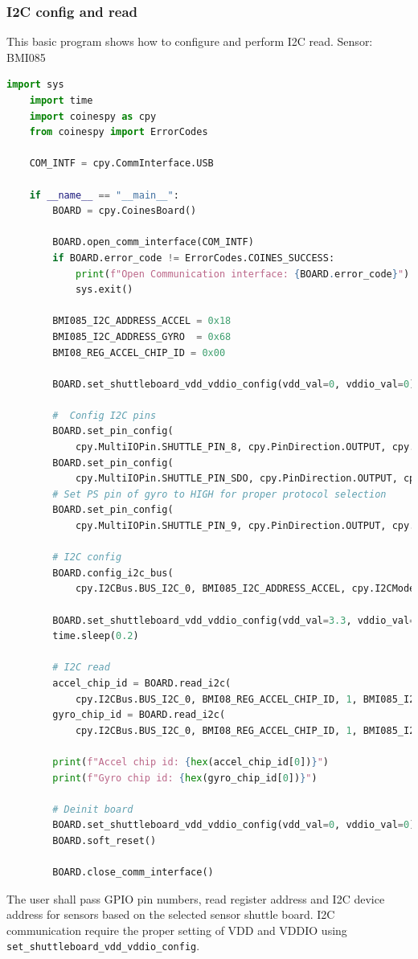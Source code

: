 \documentclass[11pt,headings=small]{scrartcl}
\begin{document}
\subsubsection{I2C config and read}
This basic program shows how to configure and perform I2C read.
\newline Sensor: BMI085
\begin{lstlisting}[language=python]
	import sys
	import time
	import coinespy as cpy
	from coinespy import ErrorCodes

	COM_INTF = cpy.CommInterface.USB
	
	if __name__ == "__main__":
		BOARD = cpy.CoinesBoard()

		BOARD.open_comm_interface(COM_INTF)
		if BOARD.error_code != ErrorCodes.COINES_SUCCESS:
			print(f"Open Communication interface: {BOARD.error_code}")
			sys.exit()
	
		BMI085_I2C_ADDRESS_ACCEL = 0x18
		BMI085_I2C_ADDRESS_GYRO  = 0x68
		BMI08_REG_ACCEL_CHIP_ID = 0x00
	
		BOARD.set_shuttleboard_vdd_vddio_config(vdd_val=0, vddio_val=0)
	
		#  Config I2C pins
		BOARD.set_pin_config(
			cpy.MultiIOPin.SHUTTLE_PIN_8, cpy.PinDirection.OUTPUT, cpy.PinValue.LOW)
		BOARD.set_pin_config(
			cpy.MultiIOPin.SHUTTLE_PIN_SDO, cpy.PinDirection.OUTPUT, cpy.PinValue.LOW)
		# Set PS pin of gyro to HIGH for proper protocol selection
		BOARD.set_pin_config(
			cpy.MultiIOPin.SHUTTLE_PIN_9, cpy.PinDirection.OUTPUT, cpy.PinValue.HIGH)
	
		# I2C config
		BOARD.config_i2c_bus(
			cpy.I2CBus.BUS_I2C_0, BMI085_I2C_ADDRESS_ACCEL, cpy.I2CMode.STANDARD_MODE)
	
		BOARD.set_shuttleboard_vdd_vddio_config(vdd_val=3.3, vddio_val=3.3)
		time.sleep(0.2)
	
		# I2C read
		accel_chip_id = BOARD.read_i2c(
			cpy.I2CBus.BUS_I2C_0, BMI08_REG_ACCEL_CHIP_ID, 1, BMI085_I2C_ADDRESS_ACCEL)
		gyro_chip_id = BOARD.read_i2c(
			cpy.I2CBus.BUS_I2C_0, BMI08_REG_ACCEL_CHIP_ID, 1, BMI085_I2C_ADDRESS_GYRO)
	
		print(f"Accel chip id: {hex(accel_chip_id[0])}")
		print(f"Gyro chip id: {hex(gyro_chip_id[0])}")
	
		# Deinit board
		BOARD.set_shuttleboard_vdd_vddio_config(vdd_val=0, vddio_val=0)
		BOARD.soft_reset()
	
		BOARD.close_comm_interface()	
\end{lstlisting}
The user shall pass GPIO pin numbers, read register address and I2C device address for sensors based on the selected sensor shuttle board. I2C communication require the proper setting of VDD and VDDIO using \texttt{set\_shuttleboard\_vdd\_vddio\_config}.
\end{document}
